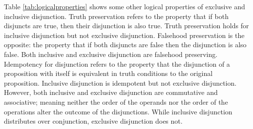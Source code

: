 \documentclass[oneside]{report}
\theoremstyle{definition}
\theoremstyle{definition}
\theoremstyle{definition}
\theoremstyle{remark}
\begin{document}
Table \ref{tab:logicalproperties} shows some other logical properties of
exclusive and inclusive disjunction. Truth preservation refers to the
property that if both disjuncts are true, then their disjunction is also
true. Truth preservation holds for inclusive disjunction but not
exclusive disjunction. Falsehood preservation is the opposite: the
property that if both disjuncts are false then the disjunction is also
false. Both inclusive and exclusive disjunction are falsehood
preserving. Idempotency for disjunction refers to the property that the
disjunction of a proposition with itself is equivalent in truth
conditions to the original proposition. Inclusive disjunction is
idempotent but not exclusive disjunction. However, both inclusive and
exclusive disjunction are commutative and associative; meaning neither
the order of the operands nor the order of the operations alter the
outcome of the disjunctions. While inclusive disjunction distributes
over conjunction, exclusive disjunction does not.
\end{document}
